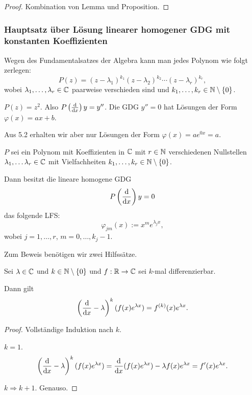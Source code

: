 \begin{proof}
  Kombination von Lemma und Proposition.
\end{proof}

\subsubsection{Hauptsatz über Lösung linearer homogener GDG mit konstanten Koeffizienten}
Wegen des Fundamentalsatzes der Algebra kann man jedes Polynom wie folgt
zerlegen:
\[ P(z) = (z-\lambda_1)^{k_1} (z-\lambda_2)^{k_2} \cdots (z-\lambda_r)^{k_r}, \tag{$\ast$} \]
wobei $\lambda_1, \ldots, \lambda_r \in \mathbb{C}$ paarweise verschieden sind und
$k_1 , \ldots, k_r \in \mathbb{N} \setminus \{0\}$.

\begin{exmp}
  $P(z) = z^2$. Also $P\left( \frac{\mathrm{d} }{\mathrm{d} x} \right) y = y''$. Die GDG $y'' = 0$ hat
  Lösungen der Form $\varphi(x) = ax + b$.

  Aus 5.2 erhalten wir aber nur Lösungen der Form $\varphi(x) = a e^{0x} = a$.
\end{exmp}

\begin{thm}
  $P$ sei ein Polynom mit Koeffizienten in $\mathbb{C}$ mit $r \in \mathbb{N}$
  verschiedenen Nullstellen $\lambda_1, \ldots \lambda_r \in \mathbb{C}$ mit
  Vielfachheiten $k_1, \ldots, k_r \in \mathbb{N} \setminus \{0\}$.

  Dann besitzt die lineare homogene GDG
  \[ P \left( \frac{\mathrm{d} }{\mathrm{d} x} \right) y = 0 \]
  das folgende LFS:
  \[ \varphi_{jm}(x) := x^m e^{\lambda_j x}, \]
  wobei $j=1,\ldots,r$, $m=0,\ldots,k_j-1$.
\end{thm}

Zum Beweis benötigen wir zwei Hilfssätze.

\begin{lem}
  Sei $\lambda \in \mathbb{C}$ und $k \in \mathbb{N} \setminus \{0 \}$ und $f: \mathbb{R} \to
  \mathbb{C}$ sei $k$-mal differenzierbar.

  Dann gilt
  \[ \left( \frac{\mathrm{d} }{\mathrm{d} x} - \lambda  \right)^k (f(x)e^{\lambda x}) = f^{(k)}(x)
    e^{\lambda x}.  \]
\end{lem}

\begin{proof}
  Vollständige Induktion nach $k$.

  $k=1$.
  \[ \left( \frac{\mathrm{d} }{\mathrm{d} x} - \lambda  \right)^k (f(x)e^{\lambda x})
    = \frac{\mathrm{d} }{\mathrm{d} x} (f(x) e^{\lambda x}) - \lambda f(x) e^{\lambda x}
    = f'(x) e^{\lambda x}. \]

  $k \Rightarrow k+1$. Genauso.
\end{proof}

